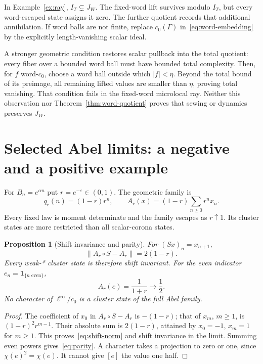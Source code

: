 \documentclass[11pt]{article}
\newtheorem{proposition}[theorem]{Proposition}
\theoremstyle{definition}
\newcommand{\eps}{\varepsilon}
\newcommand{\norm}[1]{\left\lVert#1\right\rVert}
\newcommand{\ind}{\mathbf 1}
\begin{document}
In Example~\ref{ex:ray}, $I_T\subsetneq J_W$.
The fixed-word lift survives modulo $I_T$, but every word-escaped state assigns it zero.
The further quotient records that additional annihilation.
If word balls are not finite, replace $c_0(\Gamma)$ in~\eqref{eq:word-embedding} by the explicitly length-vanishing scalar ideal.

A stronger geometric condition restores scalar pullback into the total quotient: every fiber over a bounded word ball must have bounded total complexity.
Then, for $f$ word-$c_0$, choose a word ball outside which $|f|<\eta$.
Beyond the total bound of its preimage, all remaining lifted values are smaller than $\eta$, proving total vanishing.
That condition fails in the fixed-word microlocal ray.
Neither this observation nor Theorem~\ref{thm:word-quotient} proves that sewing or dynamics preserves $J_W$.

\section{Selected Abel limits: a negative and a positive example}
\label{sec:abel}

For $B_n=e^{\alpha n}$ put $r=e^{-\eps}\in(0,1)$.
The geometric family is
\begin{equation}
 q_r(n)=(1-r)r^n,\qquad
 A_r(x)=(1-r)\sum_{n\geq0}r^n x_n.
 \label{eq:abel}
\end{equation}
Every fixed law is moment determinate and the family escapes as $r\uparrow1$.
Its cluster states are more restricted than all scalar-corona states.

\begin{proposition}[Shift invariance and parity]
\label{prop:abel-shift}
For $(Sx)_n=x_{n+1}$,
\begin{equation}
 \norm{A_r\circ S-A_r}=2(1-r).
 \label{eq:shift-norm}
\end{equation}
Every weak-* cluster state is therefore shift invariant.
For the even indicator $e_n=\ind_{\{n\text{ even}\}}$,
\begin{equation}
 A_r(e)=\frac1{1+r}\longrightarrow\frac12.
 \label{eq:parity}
\end{equation}
No character of $\ell^\infty/c_0$ is a cluster state of the full Abel family.
\end{proposition}
\begin{proof}
The coefficient of $x_0$ in $A_r\circ S-A_r$ is $-(1-r)$; that of $x_m$, $m\geq1$, is $(1-r)^2r^{m-1}$.
Their absolute sum is $2(1-r)$, attained by $x_0=-1$, $x_m=1$ for $m\geq1$.
This proves~\eqref{eq:shift-norm} and shift invariance in the limit.
Summing even powers gives~\eqref{eq:parity}.
A character takes a projection to zero or one, since $\chi(e)^2=\chi(e)$.
It cannot give $[e]$ the value one half.
\end{proof}
\end{document}
